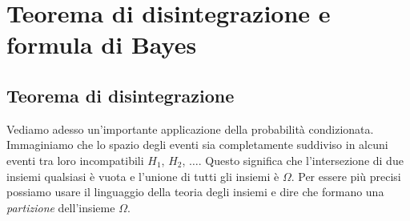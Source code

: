 \section{Teorema di disintegrazione e formula di Bayes}
\label{sec:05_bayes}

\subsection{Teorema di disintegrazione}

Vediamo adesso un'importante applicazione della probabilità condizionata. 
Immaginiamo che lo spazio degli eventi sia completamente suddiviso in alcuni 
eventi tra loro incompatibili \(H_1\), \(H_2\), \(\dots\). Questo significa che 
l'intersezione di due insiemi qualsiasi è vuota e l'unione di tutti gli 
insiemi 
è \(\Omega\). Per essere più precisi possiamo usare il linguaggio della teoria 
degli insiemi e dire che formano una \emph{partizione} dell'insieme \(\Omega\). 

